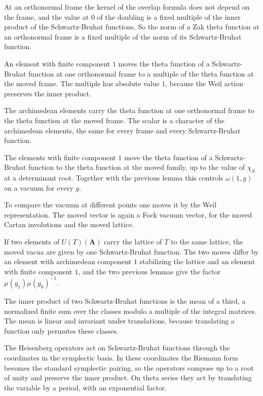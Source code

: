 At an orthonormal frame the kernel of the overlap formula does not depend on the frame, and the value at $0$ of the
doubling is a fixed multiple of the inner product of the Schwartz-Bruhat functions. So the norm of a Zak theta function at
an orthonormal frame is a fixed multiple of the norm of its Schwartz-Bruhat function.

An element with finite component $1$ moves the theta function of a Schwartz-Bruhat function at one orthonormal frame
to a multiple of the theta function at the moved frame. The multiple has absolute value $1$, because the Weil action
preserves the inner product.

The archimedean elements carry the theta function at one orthonormal frame to the theta function at the
moved frame. The scalar is a character of the archimedean elements, the same for every frame and every
Schwartz-Bruhat function.

The elements with finite component $1$ move the theta function of a Schwartz-Bruhat function to the theta
function at the moved family, up to the value of $\chi_S$ at a determinant root. Together with the
previous lemma this controls $\omega(1,g)$ on a vacuum for every $g$.

To compare the vacuum at different points one moves it by the Weil representation. The moved vector is
again a Fock vacuum vector, for the moved Cartan involutions and the moved lattice.

If two elements of $U(T)(\mathbf A)$ carry the lattice of $T$ to the same lattice, the moved vacua are
given by one Schwartz-Bruhat function. The two moves differ by an element with archimedean component $1$
stabilizing the lattice and an element with finite component $1$, and the two previous lemmas give the
factor $\mu(g_1)\mu(g_0)^{-1}$.

The inner product of two Schwartz-Bruhat functions is the mean of a third, a normalized finite sum over the
classes modulo a multiple of the integral matrices. The mean is linear and invariant under translations,
because translating a function only permutes these classes.

The Heisenberg operators act on Schwartz-Bruhat functions through the coordinates in the symplectic basis.
In these coordinates the Riemann form becomes the standard symplectic pairing, so the operators compose up
to a root of unity and preserve the inner product. On theta series they act by translating the variable by a
period, with an exponential factor.


